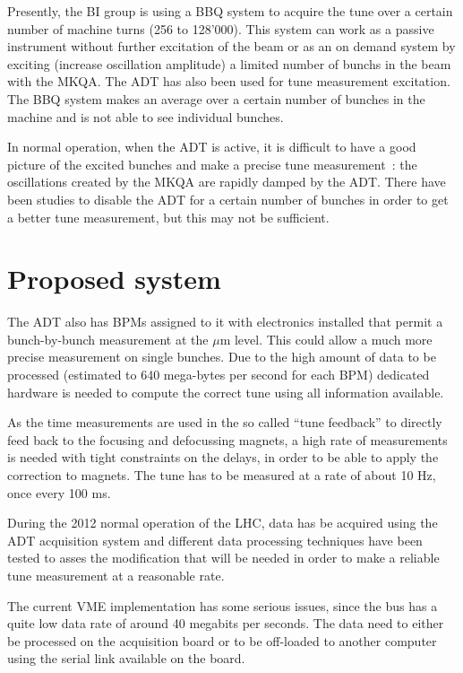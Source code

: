 Presently, the \gls{BI} group is using a \gls{BBQ} \cite{Boccardi:1156349} system to acquire the tune over a certain number of machine turns (256 to 128'000). This system can work as a passive instrument without further excitation of the beam or as an on demand system by exciting (increase oscillation amplitude) a limited number of \glspl{bunch} in the beam with the \gls{MKQA}. The \Gls{ADT} has also been used for tune measurement excitation\cite{HofleEvian10}. The \gls{BBQ} system makes an average over a certain number of bunches in the machine and is not able to see individual bunches.

In normal operation, when the \gls{ADT} is active, it is difficult to have a good picture of the excited bunches and make a precise tune measurement~: the oscillations created by the \gls{MKQA} are rapidly damped by the \gls{ADT}. There have been studies to disable the \gls{ADT} for a certain number of bunches in order to get a better tune measurement\cite{HofleEvian11}, but this may not be sufficient.

\section{Proposed system}

The \gls{ADT} also has \glspl{BPM} assigned to it with electronics installed that permit a bunch-by-bunch measurement at the $\mu$m level\cite{BphMeas07}. This could allow a much more precise measurement on single bunches. Due to the high amount of data to be processed (estimated to 640 mega-bytes per second for each \gls{BPM}) dedicated hardware is needed to compute the correct tune using all information available\cite{HofleChamonix12}.

As the time measurements are used in the so called ``tune feedback'' to directly feed back to the focusing and defocussing magnets, a high rate of measurements is needed with tight constraints on the delays, in order to be able to apply the correction to magnets. The \gls{tune} has to be measured at a rate of about 10 Hz, once every 100 ms.

During the 2012 normal operation of the \gls{LHC}, data has be acquired using the \gls{ADT} acquisition system and different data processing techniques have been tested to asses the modification that will be needed in order to make a reliable \gls{tune} measurement at a reasonable rate\cite{HofleChamonix12}.

The current \gls{VME} implementation has some serious issues, since the bus has a quite low data rate of around 40 megabits per seconds. The data need to either be processed on the acquisition board or to be off-loaded to another computer using the serial link available on the board\cite{Baudrenghien:1124094}.

